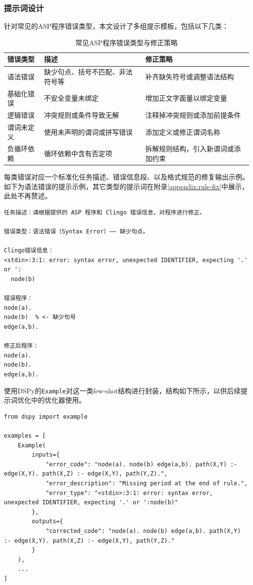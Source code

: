 \subsubsection{提示词设计}
针对常见的ASP程序错误类型，本文设计了多组提示模板，包括以下几类：
\begin{table}[H]
\centering
\caption{常见ASP程序错误类型与修正策略}
\begin{tabular}{|l|p{5.5cm}|p{5.5cm}|}
\hline
\textbf{错误类型} & \textbf{描述} & \textbf{修正策略} \\
\hline
语法错误 & 缺少句点、括号不匹配、非法符号等 & 补齐缺失符号或调整语法结构 \\
\hline
基础化错误 & 不安全变量未绑定 & 增加正文字面量以绑定变量 \\
\hline
逻辑错误 & 冲突规则或条件导致无解 & 注释掉冲突规则或添加前提条件 \\
\hline
谓词未定义 & 使用未声明的谓词或拼写错误 & 添加定义或修正谓词名称 \\
\hline
负循环依赖 & 循环依赖中含有否定项 & 拆解规则结构，引入新谓词或添加约束 \\
\hline
\end{tabular}
\end{table}
每类错误对应一个标准化任务描述、错误信息段、以及格式规范的修复输出示例。如下为语法错误的提示示例，其它类型的提示词在附录\ref{appendix:rule-fix}中展示，此处不再赘述。
\begin{lstlisting}
任务描述：请根据提供的 ASP 程序和 Clingo 错误信息，对程序进行修正。

错误类型：语法错误（Syntax Error）—— 缺少句点。

Clingo错误信息：
<stdin>:3:1: error: syntax error, unexpected IDENTIFIER, expecting '.' or ':
  node(b)

错误程序：
node(a).
node(b)  % <- 缺少句号
edge(a,b).

修正后程序：
node(a).
node(b).
edge(a,b).
\end{lstlisting}
使用DSPy的\texttt{Example}对这一类few-shot结构进行封装，结构如下所示，以供后续提示词优化中的优化器使用。
\begin{lstlisting}
from dspy import example

examples = [
    Example(
        inputs={
            "error_code": "node(a). node(b) edge(a,b). path(X,Y) :- edge(X,Y). path(X,Z) :- edge(X,Y), path(Y,Z).",
            "error_description": "Missing period at the end of rule.",
            "error_type": "<stdin>:3:1: error: syntax error, unexpected IDENTIFIER, expecting '.' or ':node(b)"
        },
        outputs={
            "corrected_code": "node(a). node(b) edge(a,b). path(X,Y) :- edge(X,Y). path(X,Z) :- edge(X,Y), path(Y,Z)."
        }
    ),
    ...
]
\end{lstlisting}
